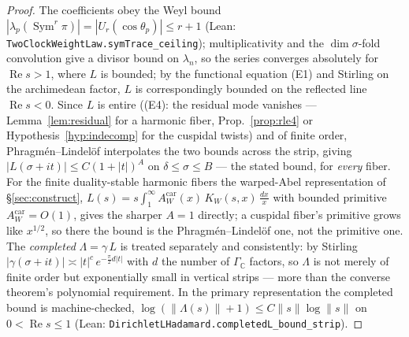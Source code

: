 \documentclass[11pt]{article}
\theoremstyle{definition}
\renewcommand{\Re}{\operatorname{Re}}
\newcommand{\Sym}{\operatorname{Sym}}
\begin{document}
\begin{proof}
The coefficients obey the Weyl bound $|\lambda_p(\Sym^r\pi)|=|U_r(\cos\theta_p)|\le r+1$ (Lean:
\texttt{TwoClockWeightLaw.symTrace\_ceiling}); multiplicativity and the $\dim\sigma$-fold convolution give a
divisor bound on $\lambda_n$, so the series converges absolutely for $\Re s>1$, where $L$ is bounded; by the
functional equation \textup{(E1)} and Stirling on the archimedean factor, $L$ is correspondingly bounded on
the reflected line $\Re s<0$. Since $L$ is entire (\textup{(E4)}: the residual mode vanishes ---
Lemma~\ref{lem:residual} for a harmonic fiber, Prop.~\ref{prop:rle4} or Hypothesis~\ref{hyp:indecomp} for the
cuspidal twists) and of finite order, Phragm\'en--Lindel\"of interpolates the two bounds across the strip, giving
$|L(\sigma+it)|\le C(1+|t|)^{A}$ on $\delta\le\sigma\le B$ --- the stated bound, for \emph{every} fiber. For
the finite duality-stable harmonic fibers the warped-Abel representation of \S\ref{sec:construct},
$L(s)=s\int_1^\infty A^{\mathrm{car}}_W(x)\,K_W(s,x)\,\tfrac{dx}{x}$ with bounded primitive
$A^{\mathrm{car}}_W=O(1)$, gives the sharper $A=1$ directly; a cuspidal fiber's primitive grows like
$x^{1/2}$, so there the bound is the Phragm\'en--Lindel\"of one, not the primitive one. The
\emph{completed} $\Lambda=\gamma\,L$ is treated separately and consistently: by Stirling
$|\gamma(\sigma+it)|\asymp|t|^{c}\,e^{-\frac{\pi}{2}d|t|}$ with $d$ the number of $\Gamma_{\mathbb C}$
factors, so $\Lambda$ is not merely of finite order but exponentially small in vertical strips --- more
than the converse theorem's polynomial requirement. In the primary representation the completed bound is
machine-checked, $\log(\|\Lambda(s)\|+1)\le C\|s\|\log\|s\|$ on $0<\Re s\le1$ (Lean:
\texttt{DirichletLHadamard.completedL\_bound\_strip}).
\end{proof}
\end{document}
